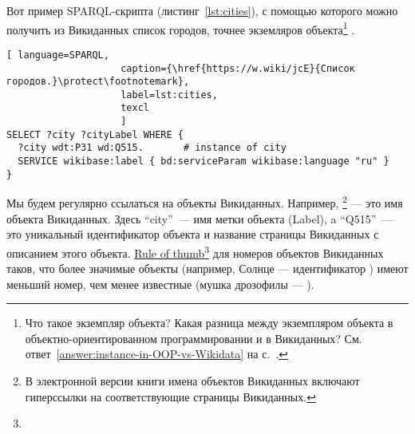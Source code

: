 Вот пример SPARQL-скрипта (листинг~\ref{lst:cities}), 
с помощью которого можно получить из Викиданных список городов, 
точнее экземляров объекта\footnote{\label{question:instance-in-OOP-vs-Wikidata}Что такое экземпляр объекта? 
    Какая разница между экземпляром объекта 
    в объектно-ориентированном программировании и в Викиданных?
    См. ответ~\ref{answer:instance-in-OOP-vs-Wikidata} на с.~\pageref{answer:instance-in-OOP-vs-Wikidata}.
    }
.

\begin{lstlisting}[ language=SPARQL, 
                    caption={\href{https://w.wiki/jcE}{Список городов.}\protect\footnotemark},
                    label=lst:cities,
                    texcl 
                    ]
SELECT ?city ?cityLabel WHERE { 
  ?city wdt:P31 wd:Q515.       # instance of city
  SERVICE wikibase:label { bd:serviceParam wikibase:language "ru" }
}
\end{lstlisting}%

Мы будем регулярно ссылаться на объекты Викиданных. 
Например, \footnote[][0cm]{%
%    
    В электронной версии книги имена объектов Викиданных включают гиперссылки на соответствующие страницы Викиданных.
} 
--- это имя объекта Викиданных. 
Здесь ``city''~--- имя метки объекта (Label), 
a ``Q515''~--- это уникальный идентификатор объекта 
и название страницы Викиданных с описанием этого объекта.
\href{https://en.wikipedia.org/wiki/Rule_of_thumb}{Rule of thumb}\footnote[][0cm]{%
%
} 
для номеров объектов Викиданных таков, что более значимые объекты 
(например, Солнце --- идентификатор ) 
имеют меньший номер, чем менее известные
(мушка дрозофилы --- ).
